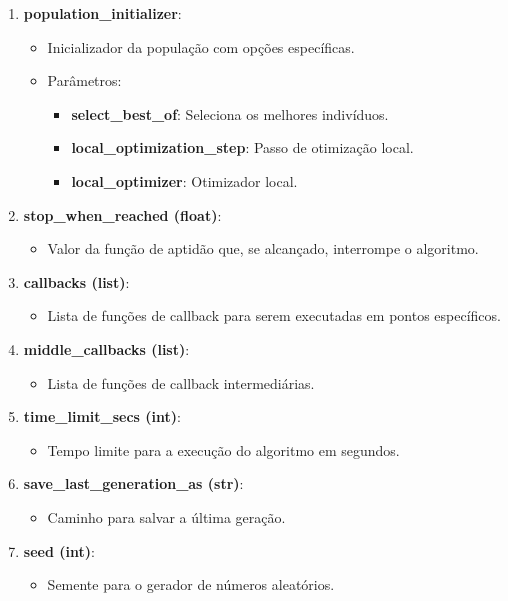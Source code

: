 \documentclass[a4paper, 12pt]{article}
\begin{document}
\begin{enumerate}
\begin{itemize}
        \item Proporção da população a ser revolucionada.
    \end{itemize}
    \item \textbf{population\_initializer}:
    \begin{itemize}
        \item Inicializador da população com opções específicas.
        \item Parâmetros:
        \begin{itemize}
            \item \textbf{select\_best\_of}: Seleciona os melhores indivíduos.
            \item \textbf{local\_optimization\_step}: Passo de otimização local.
            \item \textbf{local\_optimizer}: Otimizador local.
        \end{itemize}
    \end{itemize}
    \item \textbf{stop\_when\_reached (float)}:
    \begin{itemize}
        \item Valor da função de aptidão que, se alcançado, interrompe o algoritmo.
    \end{itemize}
    \item \textbf{callbacks (list)}:
    \begin{itemize}
        \item Lista de funções de callback para serem executadas em pontos específicos.

    \end{itemize}
    \item \textbf{middle\_callbacks (list)}:
    \begin{itemize}
        \item Lista de funções de callback intermediárias.
    \end{itemize}
    \item \textbf{time\_limit\_secs (int)}:
    \begin{itemize}
        \item Tempo limite para a execução do algoritmo em segundos.
    \end{itemize}
    \item \textbf{save\_last\_generation\_as (str)}:
    \begin{itemize}
        \item Caminho para salvar a última geração.
    \end{itemize}
    \item \textbf{seed (int)}:
    \begin{itemize}
        \item Semente para o gerador de números aleatórios.
    \end{itemize}
\end{enumerate}
\end{document}
